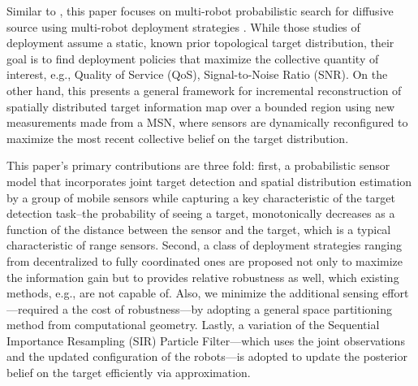 \documentclass[letterpaper, 10 pt, conference]{ieeeconf}
\newcommand{\Ram}[1]{{\normalsize{\textbf{({\color{green}Ram:\ }#1)}}}}
\newcommand{\HJP}[1]{{\normalsize{\textbf{({\color{blue}Hyongju:\ }#1)}}}}
\begin{document}
Similar to \cite{cortez2011information}, this paper focuses on multi-robot probabilistic search for diffusive source using multi-robot deployment strategies \cite{cortes_coverage_2004}. 
While those studies of deployment assume a static, known prior topological target distribution, their goal is to find deployment policies that maximize the collective quantity of interest, e.g., Quality of Service (QoS), Signal-to-Noise Ratio (SNR).
On the other hand, this presents a general framework for incremental reconstruction of spatially distributed target information map over a bounded region using new measurements made from a MSN, where sensors are dynamically reconfigured to maximize the most recent collective belief on the target distribution. 


This paper's primary contributions are three fold:
first, a probabilistic sensor model that incorporates joint target detection and spatial distribution estimation by a group of mobile sensors while capturing a key characteristic of the target detection task--the probability of seeing a target, monotonically decreases as a function of the distance between the sensor and the target, which is a typical characteristic of range sensors.
Second, a class of deployment strategies ranging from decentralized to fully coordinated ones are proposed not only to maximize the information gain but to provides relative robustness as well, which existing methods, e.g., \cite{cortez2011information} are not capable of.
Also, we minimize the additional sensing effort---required a the cost of robustness---by adopting a general space partitioning method from computational geometry.
Lastly, a variation of the Sequential Importance Resampling (SIR) Particle Filter---which uses the joint observations and the updated configuration of the robots---is adopted to update the posterior belief on the target efficiently via approximation.
\end{document}
